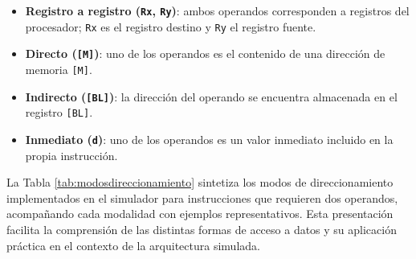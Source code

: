 \documentclass[12pt,oneside]{templates/unerthesis}
\providecommand{\tightlist}{%
  \setlength{\itemsep}{0pt}\setlength{\parskip}{0pt}}
\begin{document}
\begin{itemize}
\tightlist
\item
  \textbf{Registro a registro (\texttt{Rx}, \texttt{Ry})}: ambos operandos corresponden a registros del procesador; \texttt{Rx} es el registro destino y \texttt{Ry} el registro fuente.
\item
  \textbf{Directo (\texttt{{[}M{]}})}: uno de los operandos es el contenido de una dirección de memoria \texttt{{[}M{]}}.
\item
  \textbf{Indirecto (\texttt{{[}BL{]}})}: la dirección del operando se encuentra almacenada en el registro \texttt{{[}BL{]}}.
\item
  \textbf{Inmediato (\texttt{d})}: uno de los operandos es un valor inmediato incluido en la propia instrucción.
\end{itemize}

La Tabla \ref{tab:modosdireccionamiento} sintetiza los modos de direccionamiento implementados en el simulador para instrucciones que requieren dos operandos, acompañando cada modalidad con ejemplos representativos. Esta presentación facilita la comprensión de las distintas formas de acceso a datos y su aplicación práctica en el contexto de la arquitectura simulada.
\end{document}

